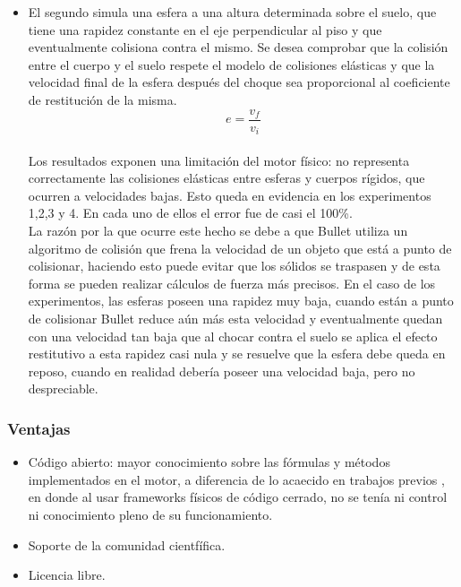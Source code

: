 \documentclass{article}
\begin{document}
\begin{itemize}
\item El segundo simula una esfera a una altura determinada sobre el suelo, que tiene una rapidez constante en el eje perpendicular al piso y que eventualmente colisiona contra el mismo. Se desea comprobar que la colisi\'on entre el cuerpo y el suelo respete el modelo de colisiones el\'asticas y que la velocidad final de la esfera despu\'es del choque sea proporcional al coeficiente de restituci\'on de la misma.\\ 
 \begin{equation}
  e = \frac{v_f}{v_i}
\end{equation}
\\Los resultados exponen una limitaci\'on del motor f\'isico: no representa correctamente las colisiones el\'asticas entre esferas y cuerpos r\'igidos, que ocurren a velocidades bajas. Esto queda en evidencia en los experimentos 1,2,3 y 4. En cada uno de ellos el error fue de casi el 100\%.\\
La raz\'on por la que ocurre este hecho se debe a que Bullet utiliza un algoritmo de colisi\'on que frena la velocidad de un objeto que est\'a a punto de colisionar, haciendo esto puede evitar que los s\'olidos se traspasen y de esta forma se pueden realizar c\'alculos de fuerza m\'as precisos. En el caso de los experimentos, las esferas poseen una rapidez muy baja, cuando est\'an a punto de colisionar Bullet reduce a\'un m\'as esta velocidad y eventualmente quedan con una velocidad tan baja que al chocar contra el suelo se aplica el efecto restitutivo a esta rapidez casi nula y se resuelve que la esfera debe queda en reposo, cuando en realidad deber\'ia poseer una velocidad baja, pero no despreciable. \\

\end{itemize}



\subsubsection{Ventajas}
\begin{itemize}[leftmargin=5.5mm]
\item C\'odigo abierto: mayor conocimiento sobre las f\'ormulas y m\'etodos implementados en el motor, a diferencia de lo acaecido en trabajos previos \cite{Cuadrupedo}, en donde al usar frameworks f\'isicos de c\'odigo cerrado, no se ten\'ia ni control ni conocimiento pleno de su funcionamiento.
\item Soporte de la comunidad cientf\'ifica.
\item Licencia libre.

\end{itemize}
\end{document}

